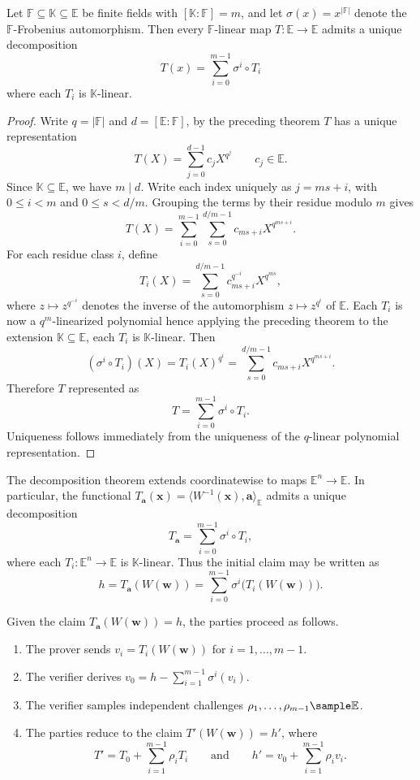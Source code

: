 \documentclass[11pt,letterpaper,usenames,dvipsnames]{article}
\begin{document}
\begin{theorem}
Let $\mathbb{F} \subseteq \mathbb{K} \subseteq \mathbb{E}$ be finite fields with $[\mathbb{K}:\mathbb{F}] = m$, and let $\sigma(x) = x^{|\mathbb{F}|}$ denote the $\mathbb{F}$-Frobenius automorphism. Then every $\mathbb{F}$-linear map $T: \mathbb{E} \to \mathbb{E}$ admits a unique decomposition
\[
T(x) = \sum_{i = 0}^{m - 1} \sigma^i \circ T_i
\]
where each $T_i$ is $\mathbb{K}$-linear.
\end{theorem}
\begin{proof}
Write $q=|\mathbb F|$ and $d=[\mathbb E:\mathbb F]$, by the preceding theorem $T$ has a unique representation
\[
T(X)=\sum_{j=0}^{d - 1} c_j X^{q^j} \qquad c_j\in\mathbb E \text{.}
\]
Since $\mathbb K\subseteq\mathbb E$, we have $m\mid d$. Write each
index uniquely as $j=ms+i$, with $0\leq i<m$ and $0\leq s<d/m$. Grouping the terms by their residue modulo $m$ gives
\[
T(X)
=
\sum_{i=0}^{m-1}
\sum_{s=0}^{d/m-1}
c_{ms+i}X^{q^{ms+i}}.
\]
For each residue class $i$, define
\[
T_i(X)
=
\sum_{s=0}^{d/m-1}
c_{ms+i}^{q^{-i}}X^{q^{ms}},
\]
where $z\mapsto z^{q^{-i}}$ denotes the inverse of the automorphism $z\mapsto z^{q^i}$ of $\mathbb E$. Each $T_i$ is now a $q^m$-linearized polynomial hence applying the preceding theorem to the extension $\mathbb{K} \subseteq \mathbb{E}$, each $T_i$ is $\mathbb{K}$-linear.  Then
\[
(\sigma^i\circ T_i)(X)
= T_i(X)^{q^i}
= \sum_{s=0}^{d/m-1} c_{ms+i}X^{q^{ms+i}} \text{.}
\]
Therefore $T$ represented as
\[
T=\sum_{i=0}^{m-1}\sigma^i\circ T_i \text{.}
\]
Uniqueness follows immediately from the uniqueness of the $q$-linear polynomial representation.
\end{proof}

The decomposition theorem extends coordinatewise to maps $\mathbb E^n\to\mathbb E$. In particular, the functional $T_{\mathbf a}(\mathbf{x}) = \langle W^{-1}(\mathbf{x}), \mathbf{a} \rangle_{\mathbb{E}}$ admits a unique decomposition
\begin{equation}
T_{\mathbf a}
=
\sum_{i=0}^{m-1}\sigma^i\circ T_i,
\end{equation}
where each $T_i:\mathbb E^n\to\mathbb E$ is $\mathbb K$-linear. Thus the initial claim may be written as
\[
h = T_{\mathbf a}(W(\mathbf w))
= \sum_{i=0}^{m-1} \sigma^i\bigl(T_i(W(\mathbf w))\bigr).
\]

\begin{construction}
Given the claim $T_{\mathbf a}(W(\mathbf w))=h$, the parties proceed as follows.
\begin{enumerate}
    \item The prover sends $v_i=T_i(W(\mathbf w))$  for $i=1,\ldots,m-1$.
    \item The verifier derives $v_0 = h-\sum_{i=1}^{m-1}\sigma^i(v_i)$.
    \item The verifier samples independent challenges $\rho_1,\ldots,\rho_{m-1}\sample\mathbb E$.
    \item The parties reduce to the claim $T'(W(\mathbf w))=h'$, where
    \[
    T' = T_0+\sum_{i=1}^{m-1}\rho_iT_i
    \qquad\text{and}\qquad
    h' = v_0+\sum_{i=1}^{m-1}\rho_iv_i.
    \]
\end{enumerate}
\end{construction}
\end{document}
